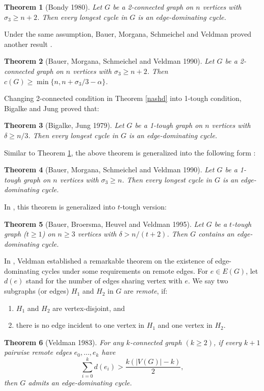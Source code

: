 \documentclass[12pt]{report}
\newtheorem{theorem}{Theorem}
\begin{document}
\begin{theorem}[Bondy 1980]\label{bong}
Let $G$ be a 2-connected graph on $n$ vertices with $\sigma_3\ge n+2$. Then every longest cycle in $G$ is an edge-dominating cycle.
\end{theorem}

Under the same assumption, Bauer, Morgana, Schmeichel and Veldman proved another result \cite{bauer1990long}.
\begin{theorem}[Bauer, Morgana, Schmeichel and Veldman 1990]\label{bmsv3}
Let $G$ be a 2-connected graph on $n$ vertices with $\sigma_3\ge n+2$. Then $c(G)\ge\min\{n,n+\sigma_3/3-\alpha\}$.
\end{theorem}

Changing 2-connected condition in Theorem \ref{nashd} into 1-tough condition, Bigalke and  Jung proved that:

\begin{theorem}[Bigalke, Jung 1979]
Let $G$ be a 1-tough graph on $n$ vertices with $\delta\ge n/3$. Then every longest cycle in $G$ is an edge-dominating cycle.
\end{theorem}


Similar to Theorem \ref{bong}, the above theorem is generalized into the following form \cite{bauer1990long}:
\begin{theorem}[Bauer, Morgana, Schmeichel and Veldman 1990]\label{bmsvtou}
Let $G$ be a 1-tough graph on $n$ vertices with $\sigma_3\ge n$. Then every longest cycle in $G$ is an edge-dominating cycle.

\end{theorem}

In \cite{bauer1995long}, this theorem is generalized into $t$-tough version:
\begin{theorem}[Bauer, Broersma, Heuvel and Veldman 1995]\label{bbhvtt}
Let $G$ be a $t$-tough graph ($t\ge1$) on $n\ge3$ vertices with $\delta>n/(t+2)$. Then $G$ contains an edge-dominating cycle.
\end{theorem}


In \cite{veldman1983existence}, Veldman established a remarkable theorem on the existence of edge-dominating cycles under some requirements on remote edges. For $e\in E(G)$, let $d(e)$ stand for the number of edges sharing vertex with $e$.
We say two subgraphs (or edges) $H_1$ and $H_2$ in $G$ are {\em remote}, if:
\begin{enumerate}
\item $H_1$ and $H_2$ are vertex-disjoint, and
\item there is no edge incident to one vertex in $H_1$ and one vertex in $H_2$.
\end{enumerate}
\begin{theorem}[Veldman 1983]\label{veldmanfound1}
For any $k$-connected graph $(k\ge2)$, if every $k+1$ pairwise remote edges $e_0,\ldots,e_k$ have $$\sum^k_{i=0}d(e_i)>\frac{k(|V(G)|-k)}{2},$$
then $G$ admits an edge-dominating cycle.
\end{theorem}
\end{document}
